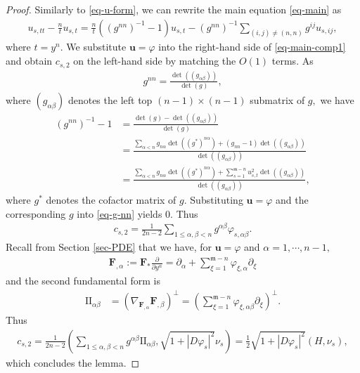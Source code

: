 \documentclass[11pt,reqno]{amsart}
\newcommand{\fm}{\mathfrak{m}}
\renewcommand{\leq}{\leqslant}
\theoremstyle{definition}
\numberwithin{equation}{section}
\begin{document}
\begin{proof}
    Similarly to \eqref{eq-u-form}, we can rewrite the main equation \eqref{eq-main} as
    \begin{align}\label{eq-main-comp1}
        u_{s, tt} -\frac{n}{t} u_{s,t} = \frac{n}{t}((g^{nn})^{-1}-1)u_{s, t} -(g^{nn})^{-1}\sum_{(i,j)\neq (n,n)}g^{ij}u_{s,ij},
    \end{align}
    where $t=y^n.$ We substitute $\mathbf{u}=\varphi$ into the right-hand side of \eqref{eq-main-comp1} and obtain $c_{s,2}$ on the left-hand side by matching the  $O(1)$ terms. 
    As \begin{align}
        g^{nn}=\frac{\det((g_{\alpha\beta}))}{\det (g)},
    \end{align}
where $(g_{\alpha\beta})$ denotes the left top $(n-1)\times (n-1)$ submatrix of $g,$ we have
\begin{align}
    (g^{nn})^{-1}-1 &= \frac{\det(g) - \det ((g_{\alpha\beta}))}{\det (g)}\\ &= \frac{\sum_{\alpha< n}g_{n\alpha}\det ((g^*)^{n\alpha})+ (g_{nn}-1) \det ((g_{\alpha\beta}))}{\det ((g_{\alpha\beta}))}\\ &= \frac{\sum_{\alpha< n}g_{n\alpha}\det ((g^*)^{n\alpha})+\sum_{s=1}^{\fm-n} u_{s,t}^2 \det ((g_{\alpha\beta}))}{\det ((g_{\alpha\beta}))},\label{eq-g-nn}
\end{align}
where $g^*$ denotes the cofactor matrix of $g.$ Substituting $\mathbf u=\varphi$ and the corresponding $g$ into \eqref{eq-g-nn} yields 0. Thus
\begin{align}\label{eq-c2-local}
    c_{s,2} =\frac{1}{2n-2}\sum_{1\leq \alpha,\beta<n}g^{\alpha\beta} \varphi_{s,\alpha \beta}. 
\end{align}
Recall from Section \ref{sec-PDE} that we have, for $\mathbf u=\varphi$ and $\alpha=1,\cdots, n-1,$
\begin{align}
    \mathbf F_{,\alpha} :=\mathbf{F}_* \frac{\partial}{\partial y^\alpha}= \partial_\alpha + \sum_{\xi=1}^{\fm-n} \varphi_{\xi, \alpha}\partial_{\xi}
\end{align}
and the second fundamental form is
\begin{align}\label{eq-II}
\mathrm{II}_{\alpha \beta} &= \left(\nabla_{\mathbf{F}_{,\alpha}}\mathbf{F}_{,\beta}\right)^\perp = \left(\sum_{\xi=1}^{\fm-n} \varphi_{\xi, \alpha\beta}\partial_{\xi}\right)^\perp.
\end{align}
Thus
\begin{align}\label{eq-c2-alter}
    c_{s,2} = \frac{1}{2n-2}\left(\sum_{1\leq \alpha,\beta<n} g^{\alpha\beta} \mathrm{II}_{\alpha \beta}, \sqrt{1+|D\varphi_s|^2}\nu_s\right)= \frac{1}{2}\sqrt{1+|D\varphi_s|^2}(H, \nu_s),
\end{align}
which concludes the lemma.
\end{proof}
\end{document}

